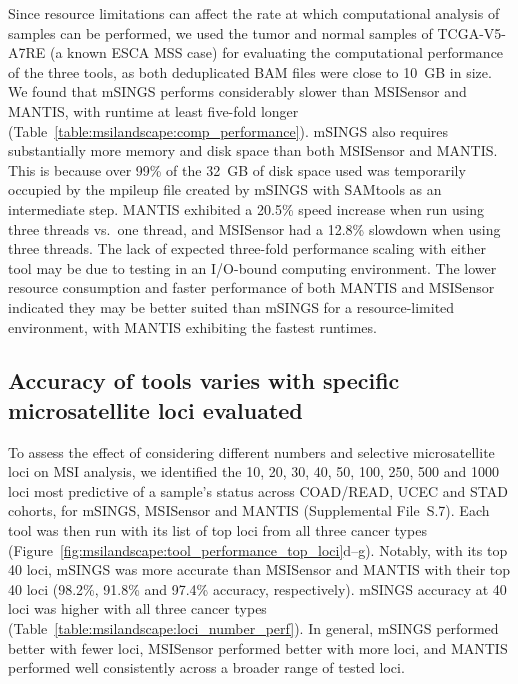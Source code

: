 Since resource limitations can affect the rate at which computational analysis of samples can be performed, we used the tumor and normal samples of TCGA-V5-A7RE (a known ESCA MSS case) for evaluating the computational performance of the three tools, as both deduplicated BAM files were close to 10~GB in size. We found that mSINGS performs considerably slower than MSISensor and MANTIS, with runtime at least five-fold longer (Table~\ref{table:msilandscape:comp_performance}). mSINGS also requires substantially more memory and disk space than both MSISensor and MANTIS\@. This is because over 99\% of the 32~GB of disk space used was temporarily occupied by the mpileup file created by mSINGS with SAMtools as an intermediate step. MANTIS exhibited a 20.5\% speed increase when run using three threads vs.\ one thread, and MSISensor had a 12.8\% slowdown when using three threads. The lack of expected three-fold performance scaling with either tool may be due to testing in an I/O-bound computing environment. The lower resource consumption and faster performance of both MANTIS and MSISensor indicated they may be better suited than mSINGS for a resource-limited environment, with MANTIS exhibiting the fastest runtimes.

\subsection{Accuracy of tools varies with specific microsatellite loci evaluated}
To assess the effect of considering different numbers and selective microsatellite loci on MSI analysis, we identified the 10, 20, 30, 40, 50, 100, 250, 500 and 1000 loci most predictive of a sample's status across COAD/READ, UCEC and STAD cohorts, for mSINGS, MSISensor and MANTIS (Supplemental File~S\thechapter{}.7). Each tool was then run with its list of top loci from all three cancer types (Figure~\ref{fig:msilandscape:tool_performance_top_loci}d--g). Notably, with its top 40 loci, mSINGS was more accurate than MSISensor and MANTIS with their top 40 loci (98.2\%, 91.8\% and 97.4\% accuracy, respectively). mSINGS accuracy at 40 loci was higher with all three cancer types (Table~\ref{table:msilandscape:loci_number_perf}). In general, mSINGS performed better with fewer loci, MSISensor performed better with more loci, and MANTIS performed well consistently across a broader range of tested loci.

